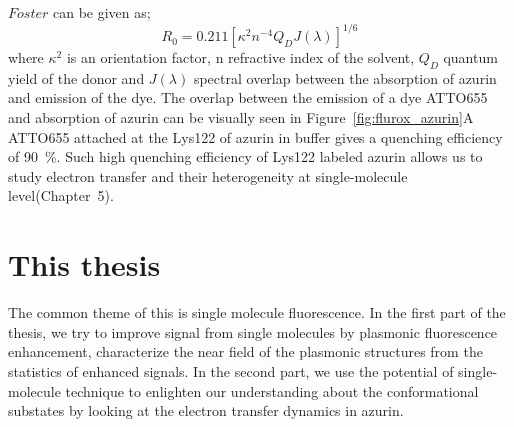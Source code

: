 $F\ddot{o}ster$ can be given as;
\begin{equation}
	R_0 = 0.211[\kappa^2n^{-4}Q_DJ(\lambda)]^{1/6}	
\end{equation}
where $\kappa^2$ is an orientation factor, n refractive index of the solvent, $Q_D$ quantum yield of the donor and $J(\lambda)$ spectral overlap between the absorption of azurin and emission of the dye.
The overlap between the emission of a dye ATTO655 and absorption of azurin can be visually seen in Figure~\ref{fig:flurox_azurin}A
ATTO655 attached at the Lys122 of azurin in buffer gives a quenching efficiency of \SI{90}{\percent}.
Such high quenching efficiency of Lys122 labeled azurin allows us to study electron transfer and their heterogeneity at single-molecule level(Chapter~5).

\section{This thesis}
The common theme of this is single molecule fluorescence. In the first part of the thesis, we try to improve signal from single molecules by plasmonic fluorescence enhancement, characterize the near field of the plasmonic structures from the statistics of enhanced signals. In the second part, we use the potential of single-molecule technique to enlighten our understanding about the conformational substates by looking at the electron transfer dynamics in azurin.

